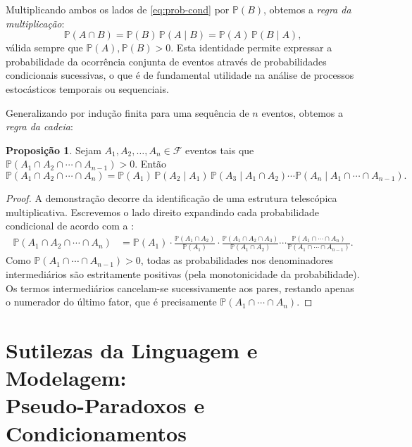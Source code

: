 \documentclass[12pt,portuguese]{article}
\theoremstyle{definition}
\newtheorem{proposition}[proposition]{Proposição}
\begin{document}
Multiplicando ambos os lados de \eqref{eq:prob-cond} por \(\mathbb{P}(B)\), obtemos a \emph{regra da multiplicação}:
\begin{equation}\label{eq:regra-multiplicacao}
  \mathbb{P}(A \cap B) = \mathbb{P}(B)\,\mathbb{P}(A \mid B) = \mathbb{P}(A)\,\mathbb{P}(B \mid A),
\end{equation}
válida sempre que \(\mathbb{P}(A), \mathbb{P}(B) > 0\). Esta identidade permite expressar a probabilidade da ocorrência conjunta de eventos através de probabilidades condicionais sucessivas, o que é de fundamental utilidade na análise de processos estocásticos temporais ou sequenciais.

Generalizando por indução finita para uma sequência de \(n\) eventos, obtemos a \emph{regra da cadeia}:

\begin{proposition}\label{prop:regra-cadeia}
Sejam \(A_1, A_2, \ldots, A_n \in \mathcal{F}\) eventos tais que \(\mathbb{P}(A_1 \cap A_2 \cap \cdots \cap A_{n-1}) > 0\). Então
\begin{equation}\label{eq:regra-cadeia}
  \mathbb{P}(A_1 \cap A_2 \cap \cdots \cap A_n) = \mathbb{P}(A_1)\,\mathbb{P}(A_2 \mid A_1)\,\mathbb{P}(A_3 \mid A_1 \cap A_2)\cdots \mathbb{P}(A_n \mid A_1 \cap \cdots \cap A_{n-1}).
\end{equation}
\end{proposition}

\begin{proof}
A demonstração decorre da identificação de uma estrutura telescópica multiplicativa. 
Escrevemos o lado direito expandindo cada probabilidade 
condicional de acordo com a :
\[
  \begin{aligned}
    \mathbb{P}(A_1 \cap A_2 \cap \cdots \cap A_n) &= \mathbb{P}(A_1) \cdot \frac{\mathbb{P}(A_1 \cap A_2)}{\mathbb{P}(A_1)} \cdot \frac{\mathbb{P}(A_1 \cap A_2 \cap A_3)}{\mathbb{P}(A_1 \cap A_2)} \cdots \frac{\mathbb{P}(A_1 \cap \cdots \cap A_n)}{\mathbb{P}(A_1 \cap \cdots \cap A_{n-1})}.
  \end{aligned}
\]
Como \(\mathbb{P}(A_1 \cap \cdots \cap A_{n-1}) > 0\), todas as probabilidades nos denominadores intermediários são estritamente positivas (pela monotonicidade da probabilidade). Os termos intermediários cancelam-se sucessivamente aos pares, restando apenas o numerador do último fator, que é precisamente \(\mathbb{P}(A_1 \cap \cdots \cap A_n)\).
\end{proof}

\section{Sutilezas da Linguagem e Modelagem:\\ Pseudo-Paradoxos e Condicionamentos}
\label{sec:paradoxos-modelagem}
\end{document}
